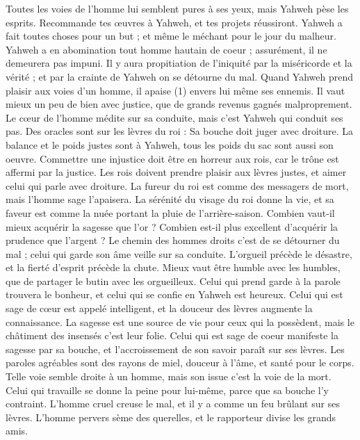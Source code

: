 \begin{multicols}{2}
Toutes les voies de l'homme lui semblent pures à ses yeux, mais Yahweh pèse les esprits.
Recommande tes œuvres à Yahweh, et tes projets réussiront.
Yahweh a fait toutes choses pour un but ; et même le méchant pour le jour du malheur.
Yahweh a en abomination tout homme hautain de coeur ; assurément, il ne demeurera pas impuni.
Il y aura propitiation de l'iniquité par la miséricorde et la vérité ; et par la crainte de Yahweh on se détourne du mal.
Quand Yahweh prend plaisir aux voies d'un homme, il apaise (1) envers lui même ses ennemis.
Il vaut mieux un peu de bien avec justice, que de grands revenus gagnés malproprement.
Le cœur de l'homme médite sur sa conduite, mais c’est Yahweh qui conduit ses pas.
Des oracles sont sur les lèvres du roi : Sa bouche doit juger avec droiture.
La balance et le poids justes sont à Yahweh, tous les poids du sac sont aussi son oeuvre.
Commettre une injustice doit être en horreur aux rois, car le trône est affermi par la justice.
Les rois doivent prendre plaisir aux lèvres justes, et aimer celui qui parle avec droiture.
La fureur du roi est comme des messagers de mort, mais l'homme sage l'apaisera.
La sérénité du visage du roi donne la vie, et sa faveur est comme la nuée portant la pluie de l’arrière-saison.
Combien vaut-il mieux acquérir la sagesse que l’or ? Combien est-il plus excellent d'acquérir la prudence que l'argent ?
Le chemin des hommes droits c'est de se détourner du mal ; celui qui garde son âme veille sur sa conduite.
L'orgueil précède le désastre, et la fierté d'esprit précède la chute.
Mieux vaut être humble avec les humbles, que de partager le butin avec les orgueilleux.
Celui qui prend garde à la parole trouvera le bonheur, et celui qui se confie en Yahweh est heureux.
Celui qui est sage de cœur est appelé intelligent, et la douceur des lèvres augmente la connaissance.
La sagesse est une source de vie pour ceux qui la possèdent, mais le châtiment des insensés c’est leur folie.
Celui qui est sage de coeur manifeste la sagesse par sa bouche, et l’accroissement de son savoir paraît sur ses lèvres.
Les paroles agréables sont des rayons de miel, douceur à l'âme, et santé pour le corps.
Telle voie semble droite à un homme, mais son issue c’est la voie de la mort.
Celui qui travaille se donne la peine pour lui-même, parce que sa bouche l’y contraint.
L’homme cruel creuse le mal, et il y a comme un feu brûlant sur ses lèvres.
L'homme pervers sème des querelles, et le rapporteur divise les grands amis.

\end{multicols}

